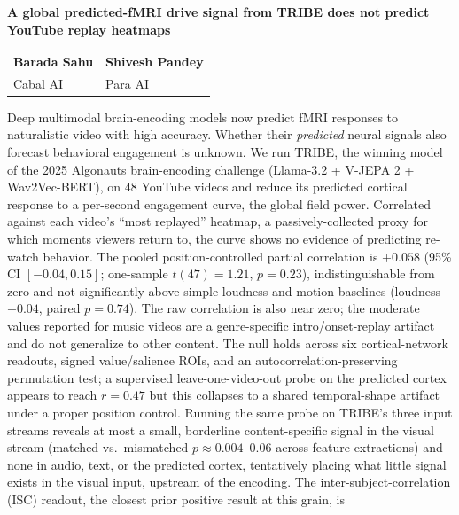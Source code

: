 \documentclass[11pt]{article}
\newcommand{\abstractbox}[1]{%
  \begingroup\setlength{\fboxsep}{10pt}%
  \noindent\colorbox{boxgray}{\begin{minipage}{\dimexpr\textwidth-2\fboxsep\relax}#1\end{minipage}}%
  \endgroup}
\begin{document}
\begin{flushleft}
{\sffamily\bfseries\fontsize{20}{24}\selectfont
A global predicted-fMRI drive signal from TRIBE does not predict YouTube replay heatmaps\par}
\vspace{10pt}
\begin{tabular}[t]{@{}l@{\hskip 3.5em}l@{}}
{\sffamily\bfseries Barada Sahu} & {\sffamily\bfseries Shivesh Pandey}\\[1pt]
Cabal AI & Para AI
\end{tabular}
\end{flushleft}

\abstractbox{%
Deep multimodal brain-encoding models now predict fMRI responses to naturalistic video with high
accuracy. Whether their \emph{predicted} neural signals also forecast behavioral engagement is
unknown. We run TRIBE, the winning model of the 2025 Algonauts brain-encoding challenge
(Llama-3.2 + V-JEPA 2 + Wav2Vec-BERT), on 48 YouTube videos and reduce its predicted cortical
response to a per-second engagement curve, the global field power. Correlated against each video's
``most replayed'' heatmap, a passively-collected proxy for which moments viewers return to, the
curve shows no evidence of predicting re-watch behavior. The pooled position-controlled partial
correlation is $+0.058$ (95\% CI $[-0.04, 0.15]$; one-sample $t(47)=1.21$, $p=0.23$),
indistinguishable from zero and not significantly above simple loudness and motion baselines
(loudness $+0.04$, paired $p=0.74$). The raw correlation is also near zero; the moderate values reported for music
videos are a genre-specific intro/onset-replay artifact and do not generalize to other content. The null holds across six cortical-network readouts, signed value/salience ROIs, and
an autocorrelation-preserving permutation test; a supervised leave-one-video-out probe on the
predicted cortex appears to reach $r=0.47$ but this collapses to a shared temporal-shape artifact
under a proper position control. Running the same probe on TRIBE's three input streams reveals at
most a small, borderline content-specific signal in the visual stream (matched vs.\ mismatched
$p\approx0.004$--$0.06$ across feature extractions) and none in audio, text, or the predicted cortex,
tentatively placing what little signal exists in the visual input, upstream of the encoding. The
inter-subject-correlation (ISC) readout, the closest prior positive result at this grain, is
}
\end{document}
